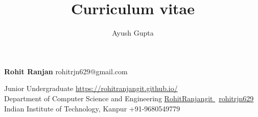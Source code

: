 \documentclass[9pt]{extarticle}
\title{Curriculum vitae}
\author{Ayush Gupta}
\begin{document}

\begingroup
{}

{\Huge\textbf{\sc Rohit Ranjan}}
\hfill
rohitrjn629@gmail.com \faEnvelope


Junior Undergraduate
\hfill
\href{https://rohitranjangit.github.io/}{https://rohitranjangit.github.io/ \faHome}\\

Department of Computer Science and Engineering
\hfill
\href{https://github.com/RohitRanjangit}{RohitRanjangit \faGithub} \textbar \ 
\href{https://www.linkedin.com/in/rohitranjan629/}{rohitrjn629 \faLinkedin} \\

Indian Institute of Technology, Kanpur
\hfill
+91-9680549779 \faMobile \\

\begin{minipage}[t]{0.49\textwidth}
  \vspace{3mm}
  
  
\end{minipage}
\hfill
\begin{minipage}[t]{0.49\textwidth}
  \vspace{3mm}
  
  
  
  
\end{minipage}


\endgroup
\end{document}
